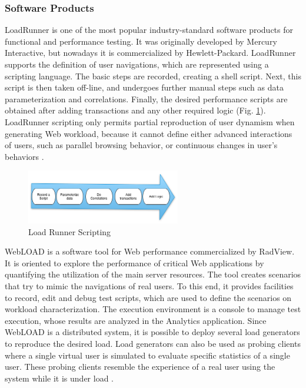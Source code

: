 \documentclass{report}
\begin{document}
\subsubsection{Software Products}

LoadRunner is one of the most popular industry-standard software products for functional and performance testing. It was originally developed by Mercury Interactive, but nowadays it is commercialized by Hewlett-Packard. LoadRunner supports the definition of user navigations, which are represented using a scripting language. The basic steps are recorded, creating a shell script. Next, this script is then taken off-line, and undergoes further manual steps such as data parameterization and correlations. Finally, the desired performance scripts are obtained after adding transactions and any other required logic (Fig. \ref{fig:loadrunner}). LoadRunner scripting only permits partial reproduction of user dynamism when generating Web workload, because it cannot define either advanced interactions of users, such as parallel browsing behavior, or continuous changes in user’s behaviors \cite{MohammadS.Obaidat}.

\begin{figure}[!ht]
\centering
\includegraphics[width=0.6\textwidth]{./images/loadrunner.png}
\caption{Load Runner Scripting}
\label{fig:loadrunner}
\end{figure}



WebLOAD is a software tool for Web performance commercialized by RadView. It is oriented to explore the performance of critical Web applications by quantifying the utilization of the main server resources. The tool creates scenarios that try to mimic the navigations of real users. To this end, it provides facilities to record, edit and debug test scripts, which are used to define the scenarios on workload characterization. The execution environment is a console to manage test execution, whose results are analyzed in the Analytics application. Since WebLOAD is a distributed system, it is possible to deploy several load generators to reproduce the desired load. Load generators can also be used as probing clients where a single virtual user is simulated to evaluate specific statistics of a single user. These probing clients resemble the experience of a real user using the system while it is under load \cite{MohammadS.Obaidat}.
\end{document}
